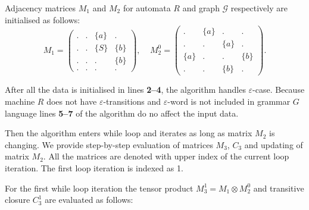 Adjacency matrices $M_1$ and $M_2$ for automata $R$ and graph $\mathcal{G}$ respectively are initialised as follows:
    $$
    M_1 =
    \begin{pmatrix}
    . & . & \{a\} & .     \\
    . & . & \{S\} & \{b\} \\
    . & . & . & \{b\}     \\
    . & . & . & .
    \end{pmatrix}
    ,~~~~~
    M_2^0 =
    \begin{pmatrix}
    . & \{a\} & . & .     \\
    . & . & \{a\} & .     \\
    \{a\} & . & . & \{b\} \\
    . & . & \{b\} & .
    \end{pmatrix}.
    $$

After all the data is initialised in lines \textbf{2--4}, the algorithm handles $\varepsilon$-case. Because machine $R$ does not have $\varepsilon$-transitions and $\varepsilon$-word is not included in grammar $G$ language lines \textbf{5--7} of the algorithm do no affect the input data.

Then the algorithm enters while loop and iterates as long as matrix $M_2$ is changing. We provide step-by-step evaluation of matrices $M_3$, $C_3$ and updating of matrix $M_2$. All the matrices are denoted with upper index of the current loop iteration. The first loop iteration is indexed as 1.

For the first while loop iteration the tensor product $M_3^1 = M_1 \otimes M_2^0$ and transitive closure $C_3^1$ are evaluated as follows:

